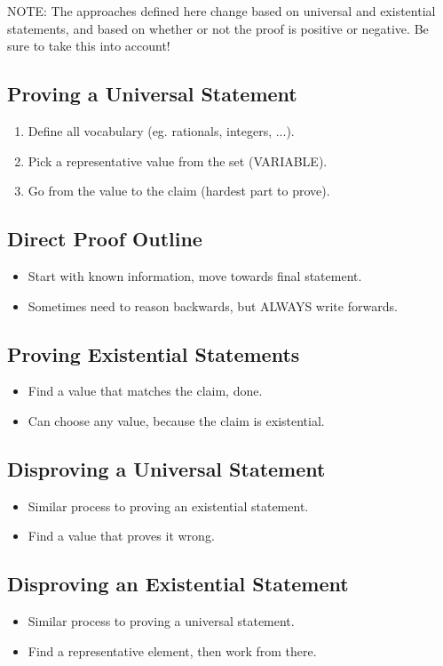NOTE: The approaches defined here change based on universal and existential statements, and based on whether or not the proof is positive or negative. Be sure to take this into account!

\subsection{Proving a Universal Statement}
\begin{enumerate}
    \item Define all vocabulary (eg. rationals, integers, ...).
    \item Pick a representative value from the set (VARIABLE).
    \item Go from the value to the claim (hardest part to prove).
\end{enumerate}

\subsection{Direct Proof Outline}
\begin{itemize}
    \item Start with known information, move towards final statement.
    \item Sometimes need to reason backwards, but ALWAYS write forwards.
\end{itemize}

\subsection{Proving Existential Statements}
\begin{itemize}
    \item Find a value that matches the claim, done.
    \item Can choose any value, because the claim is existential.
\end{itemize}

\subsection{Disproving a Universal Statement}
\begin{itemize}
    \item Similar process to proving an existential statement.
    \item Find a value that proves it wrong.
\end{itemize}

\subsection{Disproving an Existential Statement}
\begin{itemize}
    \item Similar process to proving a universal statement.
    \item Find a representative element, then work from there.
\end{itemize}

